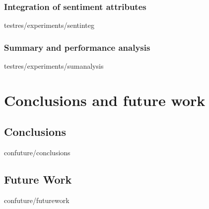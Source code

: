 \documentclass[english,epsbased,copyright,final,printable,covers,extendedindex,firstnumbered,tfg,gnuplot]{tfgtfmthesisuam}
\begin{document}
    \subsection{Integration of sentiment attributes\label{SS:SENTINTEG}}{testres/experiments/sentinteg}
    \subsection{Summary and performance analysis\label{SS:SUMANALYSIS}}{testres/experiments/sumanalysis}

\chapter{Conclusions and future work\label{CAP:CONFUTURE}}
  \section{Conclusions\label{SEC:CONCLUSIONS}}{confuture/conclusions}
  \section{Future Work\label{SEC:FUTUREWORK}}{confuture/futurework}
\end{document}
